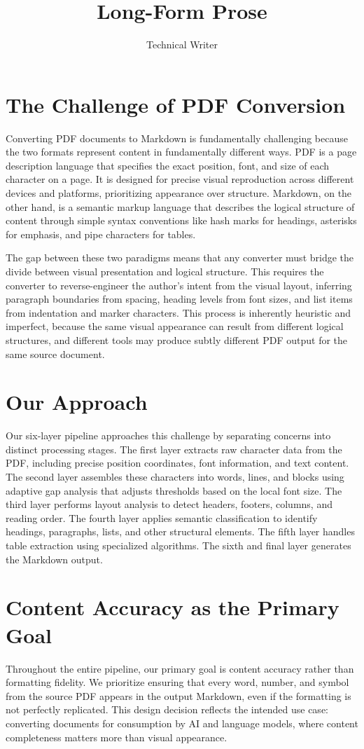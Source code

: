 \documentclass[12pt]{article}
\title{Long-Form Prose}
\author{Technical Writer}
\begin{document}
\maketitle

\section{The Challenge of PDF Conversion}
Converting PDF documents to Markdown is fundamentally challenging because the two
formats represent content in fundamentally different ways. PDF is a page description
language that specifies the exact position, font, and size of each character on a
page. It is designed for precise visual reproduction across different devices and
platforms, prioritizing appearance over structure. Markdown, on the other hand, is
a semantic markup language that describes the logical structure of content through
simple syntax conventions like hash marks for headings, asterisks for emphasis,
and pipe characters for tables.

The gap between these two paradigms means that any converter must bridge the
divide between visual presentation and logical structure. This requires the
converter to reverse-engineer the author's intent from the visual layout, inferring
paragraph boundaries from spacing, heading levels from font sizes, and list items
from indentation and marker characters. This process is inherently heuristic and
imperfect, because the same visual appearance can result from different logical
structures, and different tools may produce subtly different PDF output for the
same source document.

\section{Our Approach}
Our six-layer pipeline approaches this challenge by separating concerns into
distinct processing stages. The first layer extracts raw character data from the
PDF, including precise position coordinates, font information, and text content.
The second layer assembles these characters into words, lines, and blocks using
adaptive gap analysis that adjusts thresholds based on the local font size. The
third layer performs layout analysis to detect headers, footers, columns, and
reading order. The fourth layer applies semantic classification to identify
headings, paragraphs, lists, and other structural elements. The fifth layer
handles table extraction using specialized algorithms. The sixth and final layer
generates the Markdown output.

\section{Content Accuracy as the Primary Goal}
Throughout the entire pipeline, our primary goal is content accuracy rather than
formatting fidelity. We prioritize ensuring that every word, number, and symbol
from the source PDF appears in the output Markdown, even if the formatting is
not perfectly replicated. This design decision reflects the intended use case:
converting documents for consumption by AI and language models, where content
completeness matters more than visual appearance.
\end{document}
